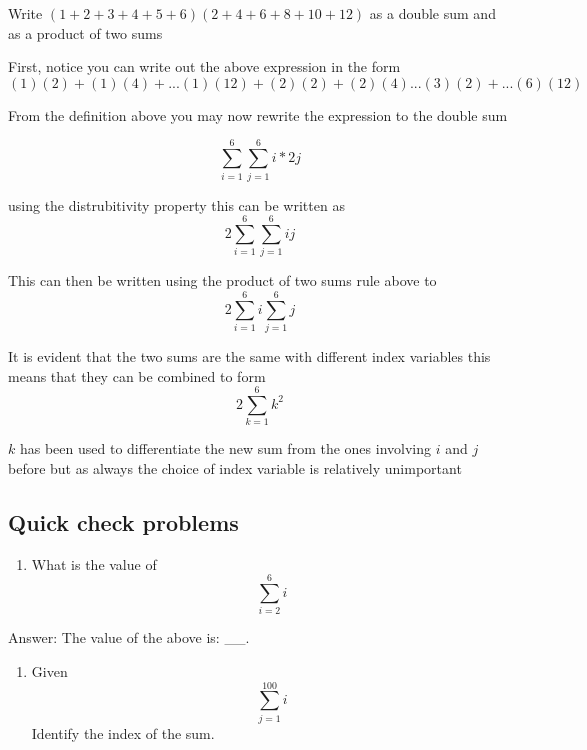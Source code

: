 \documentclass[
  12pt,
  a4paper, oneside]{starmastarticle}
\providecommand{\tightlist}{%
  \setlength{\itemsep}{0pt}\setlength{\parskip}{0pt}}\usepackage{longtable,booktabs,array}
\begin{document}
\begin{tcolorbox}[enhanced jigsaw, left=2mm, toprule=.15mm, colback=white, opacityback=0, breakable, colframe=quarto-callout-note-color-frame, leftrule=.75mm, arc=.35mm, rightrule=.15mm, bottomrule=.15mm]
\begin{minipage}[t]{5.5mm}
\textcolor{quarto-callout-note-color}{\faInfo}
\end{minipage}%
\begin{minipage}[t]{\textwidth - 5.5mm}
Write \((1+2+3+4+5+6)(2+4+6+8+10+12)\) as a double sum and as a product
of two sums

First, notice you can write out the above expression in the form
\((1)(2) + (1)(4) + ... (1)(12) + (2)(2) + (2)(4) ... (3)(2) + ...(6)(12)\)

From the definition above you may now rewrite the expression to the
double sum

\[\sum_{i=1}^6\sum_{j=1}^6 i*2j\]

using the distrubitivity property this can be written as
\[2\sum_{i=1}^6\sum_{j=1}^6 ij\]

This can then be written using the product of two sums rule above to
\[2\sum_{i=1}^6i\sum_{j=1}^6j\]

It is evident that the two sums are the same with different index
variables this means that they can be combined to form
\[2\sum_{k=1}^6k^2\]

\(k\) has been used to differentiate the new sum from the ones involving
\(i\) and \(j\) before but as always the choice of index variable is
relatively unimportant\end{minipage}%
\end{tcolorbox}

\hypertarget{quick-check-problems}{%
\subsection*{Quick check problems}\label{quick-check-problems}}

\begin{enumerate}
\def\labelenumi{\arabic{enumi}.}
\tightlist
\item
  What is the value of \[\sum_{i = 2}^{6} i\]
\end{enumerate}

Answer: The value of the above is: \_\_.

\begin{enumerate}
\def\labelenumi{\arabic{enumi}.}
\setcounter{enumi}{1}
\tightlist
\item
  Given \[\sum_{j = 1}^{100} i\] Identify the index of the sum.
\end{enumerate}
\end{document}
